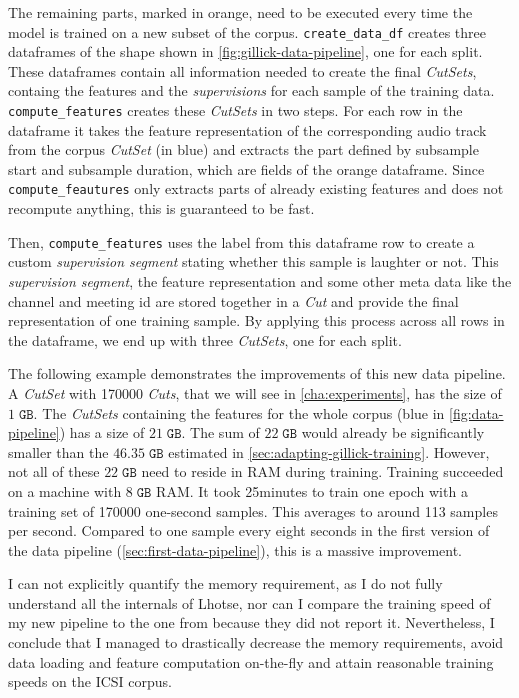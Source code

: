\documentclass[bsc,frontabs,parskip,deptreport]{infthesis}
\begin{document}
The remaining parts, marked in orange, need to be executed every time the model is trained on a new subset of the corpus.
\verb|create_data_df| creates three dataframes of the shape shown in \autoref{fig:gillick-data-pipeline}, one for each split.
These dataframes contain all information needed to create the final \textit{CutSets}, containg the features and the \textit{supervisions} for each sample of the training data.
\verb|compute_features| creates these \textit{CutSets} in two steps. For each row in the dataframe it takes the feature representation of the corresponding audio track from the corpus \textit{CutSet} (in blue) and extracts the part defined by subsample start and subsample duration, which are fields of the orange dataframe. Since \verb|compute_feautures| only extracts parts of already existing features and does not recompute anything, this is guaranteed to be fast.

Then, \verb|compute_features| uses the label from this dataframe row to create a custom \textit{supervision segment} stating whether this sample is laughter or not. 
This \textit{supervision segment}, the feature representation and some other meta data like the channel and meeting id are stored together in a \textit{Cut} and provide the final representation of one training sample.
By applying this process across all rows in the dataframe, we end up with three \textit{CutSets}, one for each split. 

The following example demonstrates the improvements of this new data pipeline.
A \textit{CutSet} with 170000 \textit{Cuts}, that we will see in \autoref{cha:experiments}, has the size of $1\;\mathtt{GB}$.
The \textit{CutSets} containing the features for the whole corpus (blue in \autoref{fig:data-pipeline}) has a size of $21\;\mathtt{GB}$. 
The sum of $22\;\mathtt{GB}$ would already be significantly smaller than the $46.35\;\mathtt{GB}$ estimated in \autoref{sec:adapting-gillick-training}. However, not all of these $22\;\mathtt{GB}$ need to reside in RAM during training. 
Training succeeded on a machine with $8\;\mathtt{GB}$ RAM. It took 25minutes to train one epoch with a training set of 170000 one-second samples.
This averages to around 113 samples per second. Compared to one sample every eight seconds in the first version of the data pipeline (\autoref{sec:first-data-pipeline}), this is a massive improvement.

I can not explicitly quantify the memory requirement, as I do not fully understand all the internals of Lhotse, nor can I compare the training speed of my new pipeline to the one from \citet{gillick2021robust} because they did not report it.
Nevertheless, I conclude that I managed to drastically decrease the memory requirements, avoid data loading and feature computation on-the-fly and attain reasonable training speeds on the ICSI corpus.
\end{document}
